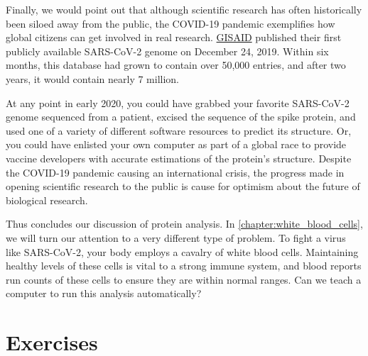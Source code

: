 Finally, we would point out that although scientific research has often historically been siloed away from the public, the COVID-19 pandemic exemplifies how global citizens can get involved in real research. \href{https://www.gisaid.org}{GISAID} published their first publicly available SARS-CoV-2 genome on December 24, 2019. Within six months, this database had grown to contain over 50,000 entries, and after two years, it would contain nearly 7 million.

At any point in early 2020, you could have grabbed your favorite SARS-CoV-2 genome sequenced from a patient, excised the sequence of the spike protein, and used one of a variety of different software resources to predict its structure. Or, you could have enlisted your own computer as part of a global race to provide vaccine developers with accurate estimations of the protein's structure. Despite the COVID-19 pandemic causing an international crisis, the progress made in opening scientific research to the public is cause for optimism about the future of biological research.

Thus concludes our discussion of protein analysis. In \autoref{chapter:white_blood_cells}, we will turn our attention to a very different type of problem. To fight a virus like SARS-CoV-2, your body employs a cavalry of white blood cells. Maintaining healthy levels of these cells is vital to a strong immune system, and blood reports run counts of these cells to ensure they are within normal ranges. Can we teach a computer to run this analysis automatically?

\newpage

\FloatBarrier
\section{Exercises}
\label{sec:coronavirus_exercises}

\begin{exercise}\end{exercise}
